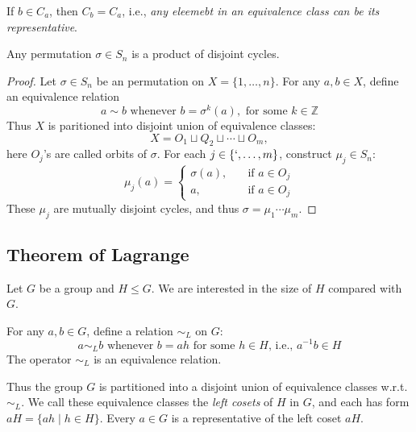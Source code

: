 \begin{remark}
If $b\in C_a$, then $C_b=C_a$, i.e., \emph{any eleemebt in an equivalence class can be its representative}.
\end{remark}
\begin{proposition}
Any permutation $\sigma\in S_n$ is a product of disjoint cycles.
\end{proposition}
\begin{proof}
Let $\sigma\in S_n$ be an permutation on $X=\{1,\dots,n\}$. For any $a,b\in X$, define an equivalence relation
\[
a\sim b\mbox{ whenever }b=\sigma^k(a),\mbox{ for some }k\in\mathbb{Z}
\]
Thus $X$ is paritioned into disjoint union of equivalence classes:
\[
X=O_1\sqcup Q_2\sqcup \cdots\sqcup O_m,
\]
here $O_j$'s are called orbits of $\sigma$. For each $j\in\{`,\dots,m\}$, construct $\mu_j\in S_n$:
\[
\mu_j(a)=\left\{
\begin{aligned}
\sigma(a),&\quad\mbox{if }a\in O_j\\
a,&\quad\mbox{if }a\in O_j
\end{aligned}
\right.
\]
These $\mu_j$ are mutually disjoint cycles, and thus $\sigma=\mu_1\cdots\mu_m$.
\end{proof}
\subsection{Theorem of Lagrange}
Let $G$ be a group and $H\le G$. We are interested in the size of $H$ compared with $G$. 
\begin{proposition}
For any $a,b\in G$, define a relation $\sim_L$ on $G$:
\[
a\sim_Lb\mbox{ whenever $b=ah$ for some $h\in H$, i.e., $a^{-1}b\in H$}
\]
The operator $\sim_L$ is an equivalence relation.
\end{proposition}
Thus the group $G$ is partitioned into a disjoint union of equivalence classes w.r.t. $\sim_L$. We call these equivalence classes the \emph{left cosets} of $H$ in $G$, and each has form $aH=\{ah\mid h\in H\}$. Every $a\in G$ is a representative of the left coset $aH$.

